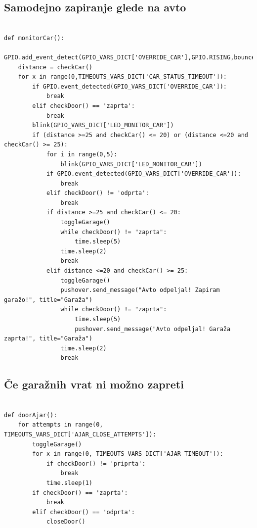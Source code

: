 \documentclass[11pt]{article}
\begin{document}
\subsection{Samodejno zapiranje glede na avto}
\begin{verbatim}
  
def monitorCar():
    GPIO.add_event_detect(GPIO_VARS_DICT['OVERRIDE_CAR'],GPIO.RISING,bouncetime=300)
    distance = checkCar()
    for x in range(0,TIMEOUTS_VARS_DICT['CAR_STATUS_TIMEOUT']):
        if GPIO.event_detected(GPIO_VARS_DICT['OVERRIDE_CAR']):
            break
        elif checkDoor() == 'zaprta':
            break
        blink(GPIO_VARS_DICT['LED_MONITOR_CAR'])
        if (distance >=25 and checkCar() <= 20) or (distance <=20 and checkCar() >= 25):
            for i in range(0,5):
                blink(GPIO_VARS_DICT['LED_MONITOR_CAR'])
            if GPIO.event_detected(GPIO_VARS_DICT['OVERRIDE_CAR']):
                break
            elif checkDoor() != 'odprta':
                break
            if distance >=25 and checkCar() <= 20:
                toggleGarage()
                while checkDoor() != "zaprta":
                    time.sleep(5)
                time.sleep(2)
                break
            elif distance <=20 and checkCar() >= 25:
                toggleGarage()
                pushover.send_message("Avto odpeljal! Zapiram garažo!", title="Garaža")
                while checkDoor() != "zaprta":
                    time.sleep(5)
                    pushover.send_message("Avto odpeljal! Garaža zaprta!", title="Garaža")
                time.sleep(2)
                break
\end{verbatim}

\subsection{Če garažnih vrat ni možno zapreti}
\begin{verbatim}
  
def doorAjar():
    for attempts in range(0, TIMEOUTS_VARS_DICT['AJAR_CLOSE_ATTEMPTS']):
        toggleGarage()
        for x in range(0, TIMEOUTS_VARS_DICT['AJAR_TIMEOUT']):
            if checkDoor() != 'priprta':
                break
            time.sleep(1)
        if checkDoor() == 'zaprta':
            break
        elif checkDoor() == 'odprta':
            closeDoor()
\end{verbatim}
\end{document}
